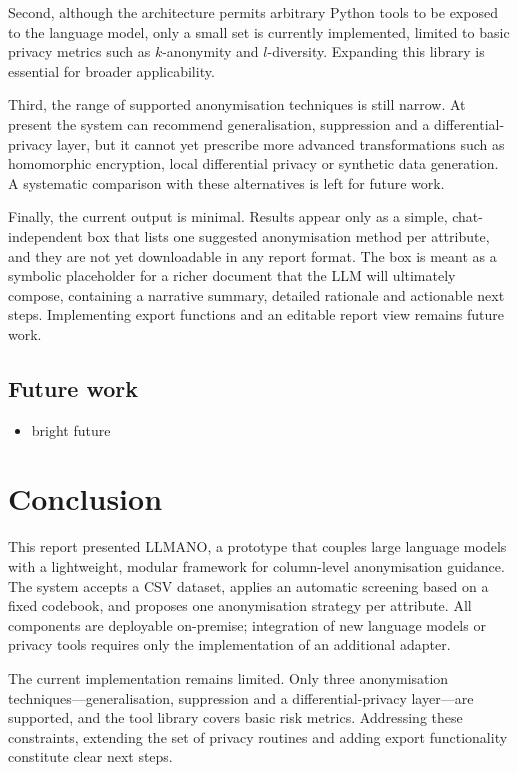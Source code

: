 \documentclass{article}
\begin{document}
Second, although the architecture permits arbitrary Python tools to be exposed to the language model, only a small set is currently implemented, limited to basic privacy metrics such as $k$-anonymity and $l$-diversity.  Expanding this library is essential for broader applicability.  

Third, the range of supported anonymisation techniques is still narrow.  At present the system can recommend generalisation, suppression and a differential-privacy layer, but it cannot yet prescribe more advanced transformations such as homomorphic encryption, local differential privacy or synthetic data generation.  A systematic comparison with these alternatives is left for future work.  

Finally, the current output is minimal.  Results appear only as a simple, chat-independent box that lists one suggested anonymisation method per attribute, and they are not yet downloadable in any report format.  The box is meant as a symbolic placeholder for a richer document that the LLM will ultimately compose, containing a narrative summary, detailed rationale and actionable next steps.  Implementing export functions and an editable report view remains future work.

\subsection{Future work}
\begin{itemize}
    \item bright future
\end{itemize}

\section{Conclusion}
\label{sec:conclusion}

This report presented LLMANO, a prototype that couples large language models with a lightweight, modular framework for column-level anonymisation guidance.  The system accepts a CSV dataset, applies an automatic screening based on a fixed codebook, and proposes one anonymisation strategy per attribute.  All components are deployable on-premise; integration of new language models or privacy tools requires only the implementation of an additional adapter.

The current implementation remains limited.  Only three anonymisation techniques—generalisation, suppression and a differential-privacy layer—are supported, and the tool library covers basic risk metrics. Addressing these constraints, extending the set of privacy routines and adding export functionality constitute clear next steps.
\end{document}
